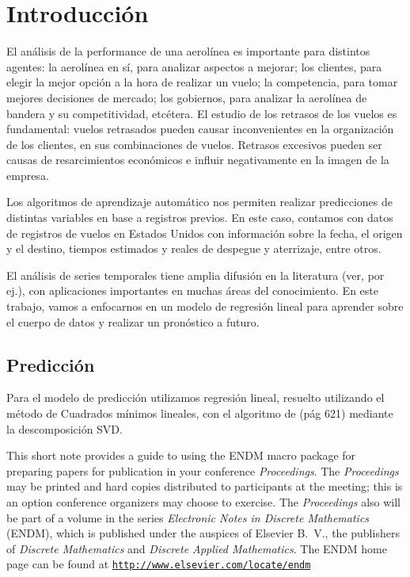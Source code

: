 \section{Introducci\'on}\label{sec:intro}

El an\'alisis de la performance de una aerol\'inea es importante para
distintos agentes: la aerol\'inea en s\'i, para analizar aspectos a
mejorar; los clientes, para elegir la mejor opci\'on a la hora de realizar
un vuelo; la competencia, para tomar mejores decisiones de mercado;
los gobiernos, para analizar la aerol\'inea de bandera y su 
competitividad, etc\'etera. El estudio de los retrasos de los vuelos
es fundamental: vuelos retrasados pueden causar inconvenientes en
la organizaci\'on de los clientes, en sus combinaciones de vuelos.
Retrasos excesivos pueden ser causas de resarcimientos econ\'omicos
e influir negativamente en la imagen de la empresa.

Los algoritmos de aprendizaje autom\'atico nos permiten realizar
predicciones de distintas variables en base a registros previos.
En este caso, contamos con datos de registros de vuelos en Estados Unidos con
informaci\'on sobre la fecha, el origen y el destino, tiempos
estimados y reales de despegue y aterrizaje, entre otros.

El an\'alisis de series temporales tiene amplia difusi\'on en la
literatura (ver\cite{timeseries}, por ej.), con aplicaciones importantes
en muchas \'areas del
conocimiento. En este trabajo, vamos a enfocarnos en un modelo de regresi\'on
lineal para aprender sobre el cuerpo de datos y realizar un pron\'ostico
a futuro.

\subsection{Predicci\'on}\label{subsec:prediction}
Para el modelo de predicci\'on utilizamos regresi\'on lineal\cite{esl},
resuelto utilizando el m\'etodo de Cuadrados m\'inimos lineales, con el algoritmo
de\cite{burden} (p\'ag 621) mediante la descomposici\'on SVD.

\iffalse
This short note provides a guide to using the ENDM macro package for
preparing papers for publication in your conference \emph{Proceedings}.
The \emph{Proceedings} may be printed and hard copies distributed to
participants at the meeting; this is an option conference organizers
may choose to exercise.  The \emph{Proceedings} also will be part of
a volume in the series \emph{Electronic Notes in Discrete Mathematics}
(ENDM), which is published under the auspices of Elsevier B.~V., the
publishers of \emph{Discrete Mathematics} and \emph{Discrete Applied
Mathematics}. The ENDM home page can be found at
\href{http://www.elsevier.com/locate/endm}
{\texttt{http://www.elsevier.com/locate/endm}}

